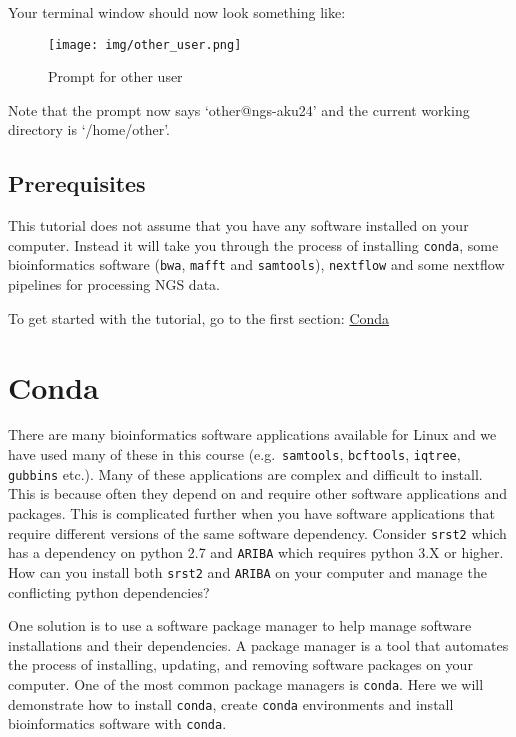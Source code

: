 \documentclass[11pt]{article}
\begin{document}
    Your terminal window should now look something like:

    \begin{figure}
\centering
\texttt{[image: img/other\_user.png]}
\caption{Prompt for other user}
\end{figure}

    Note that the prompt now says `other@ngs-aku24' and the current working
directory is `/home/other'.

    \hypertarget{prerequisites}{%
\subsection{Prerequisites}\label{prerequisites}}

This tutorial does not assume that you have any software installed on
your computer. Instead it will take you through the process of
installing \texttt{conda}, some bioinformatics software (\texttt{bwa},
\texttt{mafft} and \texttt{samtools}), \texttt{nextflow} and some
nextflow pipelines for processing NGS data.

    To get started with the tutorial, go to the first section:
\href{conda.ipynb}{Conda}





\newpage





    \hypertarget{conda}{%
\section{Conda}\label{conda}}

There are many bioinformatics software applications available for Linux
and we have used many of these in this course (e.g.~\texttt{samtools},
\texttt{bcftools}, \texttt{iqtree}, \texttt{gubbins} etc.). Many of
these applications are complex and difficult to install. This is because
often they depend on and require other software applications and
packages. This is complicated further when you have software
applications that require different versions of the same software
dependency. Consider \texttt{srst2} which has a dependency on python 2.7
and \texttt{ARIBA} which requires python 3.X or higher. How can you
install both \texttt{srst2} and \texttt{ARIBA} on your computer and
manage the conflicting python dependencies?

One solution is to use a software package manager to help manage
software installations and their dependencies. A package manager is a
tool that automates the process of installing, updating, and removing
software packages on your computer. One of the most common package
managers is \texttt{conda}. Here we will demonstrate how to install
\texttt{conda}, create \texttt{conda} environments and install
bioinformatics software with \texttt{conda}.
\end{document}
